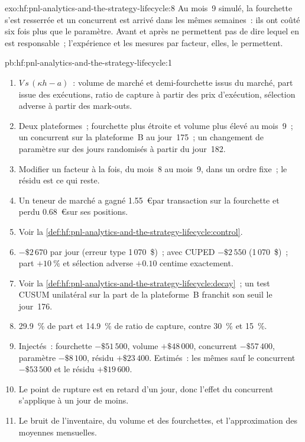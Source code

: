 \begin{solution}{exo:hf:pnl-analytics-and-the-strategy-lifecycle:8}
Au mois~9 simulé, la fourchette s'est resserrée et un concurrent est arrivé dans les mêmes semaines~: ils ont coûté six fois plus que le paramètre. Avant et
après ne permettent pas de dire lequel en est responsable~; l'expérience et les mesures par facteur, elles, le permettent.
\end{solution}

\begin{solution}{pb:hf:pnl-analytics-and-the-strategy-lifecycle:1}
\begin{enumerate}
\item $V\,s\,(\kappa h-a)$~: volume de marché et demi-fourchette issus du marché, part issue des exécutions, ratio de capture à partir des prix d'exécution, sélection
adverse à partir des mark-outs.
\item Deux plateformes~; fourchette plus étroite et volume plus élevé au mois~9~; un concurrent sur la plateforme~B au jour~175~; un changement de paramètre sur des jours randomisés à partir du jour~182.
\item Modifier un facteur à la fois, du mois~8 au mois~9, dans un ordre fixe~; le résidu est ce qui reste.
\item Un teneur de marché a gagné 1.55~\euro par transaction sur la fourchette et perdu 0.68~\euro sur ses positions.
\item Voir la \cref{def:hf:pnl-analytics-and-the-strategy-lifecycle:control}.
\item $-\$2\,670$ par jour (erreur type 1\,070~\$)~; avec CUPED $-\$2\,550$ (1\,070~\$)~; part $+10~\%$ et sélection adverse $+0.10$ centime exactement.
\item Voir la \cref{def:hf:pnl-analytics-and-the-strategy-lifecycle:decay}~; un test CUSUM unilatéral sur la part de la plateforme~B franchit son seuil le jour~176.
\item 29.9~\% de part et 14.9~\% de ratio de capture, contre 30~\% et 15~\%.
\item Injectés~: fourchette $-\$51\,500$, volume $+\$48\,000$, concurrent $-\$57\,400$, paramètre $-\$8\,100$, résidu $+\$23\,400$. Estimés~: les mêmes
sauf le concurrent $-\$53\,500$ et le résidu $+\$19\,600$.
\item Le point de rupture est en retard d'un jour, donc l'effet du concurrent s'applique à un jour de moins.
\item Le bruit de l'inventaire, du volume et des fourchettes, et l'approximation des moyennes mensuelles.

\end{enumerate}
\end{solution}
